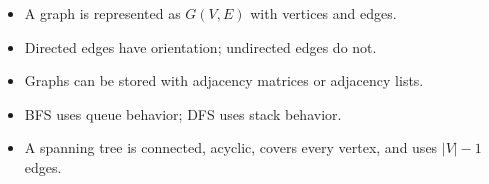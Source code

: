 \begin{chapterrecap}
\begin{itemize}
  \item A graph is represented as $G(V,E)$ with vertices and edges.
  \item Directed edges have orientation; undirected edges do not.
  \item Graphs can be stored with adjacency matrices or adjacency lists.
  \item BFS uses queue behavior; DFS uses stack behavior.
  \item A spanning tree is connected, acyclic, covers every vertex, and uses $|V|-1$ edges.
\end{itemize}
\end{chapterrecap}


